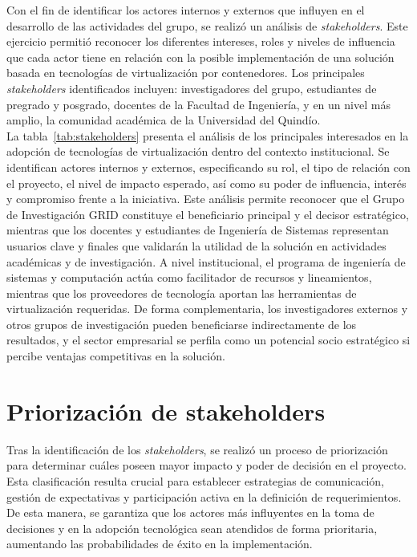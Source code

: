 Con el fin de identificar los actores internos y externos que influyen en el desarrollo de las actividades del grupo, se realizó un análisis de \textit{stakeholders}. Este ejercicio permitió reconocer los diferentes intereses, roles y niveles de influencia que cada actor tiene en relación con la posible implementación de una solución basada en tecnologías de virtualización por contenedores. Los principales \textit{stakeholders} identificados incluyen: investigadores del grupo, estudiantes de pregrado y posgrado, docentes de la Facultad de Ingeniería, y en un nivel más amplio, la comunidad académica de la Universidad del Quindío.\\
La tabla~\ref{tab:stakeholders} presenta el análisis de los principales interesados en la adopción de tecnologías de virtualización dentro del contexto institucional. Se identifican actores internos y externos, especificando su rol, el tipo de relación con el proyecto, el nivel de impacto esperado, así como su poder de influencia, interés y compromiso frente a la iniciativa. Este análisis permite reconocer que el Grupo de Investigación GRID constituye el beneficiario principal y el decisor estratégico, mientras que los docentes y estudiantes de Ingeniería de Sistemas representan usuarios clave y finales que validarán la utilidad de la solución en actividades académicas y de investigación. A nivel institucional, el programa de ingeniería de sistemas y computación actúa como facilitador de recursos y lineamientos, mientras que los proveedores de tecnología aportan las herramientas de virtualización requeridas. De forma complementaria, los investigadores externos y otros grupos de investigación pueden beneficiarse indirectamente de los resultados, y el sector empresarial se perfila como un potencial socio estratégico si percibe ventajas competitivas en la solución.


\section{Priorización de stakeholders}

Tras la identificación de los \textit{stakeholders}, se realizó un proceso de priorización para determinar cuáles poseen mayor impacto y poder de decisión en el proyecto. Esta clasificación resulta crucial para establecer estrategias de comunicación, gestión de expectativas y participación activa en la definición de requerimientos. De esta manera, se garantiza que los actores más influyentes en la toma de decisiones y en la adopción tecnológica sean atendidos de forma prioritaria, aumentando las probabilidades de éxito en la implementación.  

